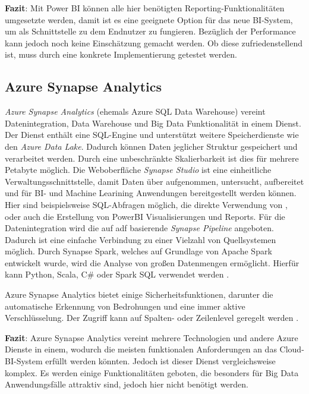 \textbf{Fazit}: Mit Power BI können alle hier benötigten Reporting-Funktionalitäten umgesetzte werden, damit ist es eine geeignete Option für das neue BI-System, um als Schnittstelle zu dem Endnutzer zu fungieren. Bezüglich der Performance kann jedoch noch keine Einschätzung gemacht werden. Ob diese zufriedenstellend ist, muss durch eine konkrete Implementierung getestet werden.


\subsection{Azure Synapse Analytics} \label{sec:grundlagen:azure_dienste:synapseAnalytics}
\textit{Azure Synapse Analytics} (ehemals Azure SQL Data Warehouse) vereint Datenintegration, Data Warehouse und Big Data Funktionalität in einem Dienst. Der Dienst enthält eine SQL-Engine und unterstützt weitere Speicherdienste wie den \textit{Azure Data Lake}. Dadurch können Daten jeglicher Struktur gespeichert und verarbeitet werden. Durch eine unbeschränkte Skalierbarkeit ist dies für mehrere Petabyte möglich. Die Weboberfläche \textit{Synapse Studio} ist eine einheitliche Verwaltungsschnittstelle, damit Daten über aufgenommen, untersucht, aufbereitet und für BI- und Machine Learining Anwendungen bereitgestellt werden können. Hier sind beispielsweise SQL-Abfragen möglich, die direkte Verwendung von , oder auch die Erstellung von PowerBI Visualisierungen und Reports. Für die Datenintegration wird die auf \ac{adf} basierende \textit{Synapse Pipeline} angeboten. Dadurch ist eine einfache Verbindung zu einer Vielzahl von Quellsystemen möglich. Durch Synapse Spark, welches auf Grundlage von Apache Spark entwickelt wurde, wird die Analyse von großen Datenmengen ermöglicht. Hierfür kann Python, Scala, C\# oder Spark SQL verwendet werden \cite{shiyal_beginning_2021}. 

Azure Synapse Analytics bietet einige Sicherheitsfunktionen, darunter die automatische Erkennung von Bedrohungen und eine immer aktive Verschlüsselung. Der Zugriff kann auf Spalten- oder Zeilenlevel geregelt werden \cite{shiyal_beginning_2021}.

\textbf{Fazit}: Azure Synapse Analytics vereint mehrere Technologien und andere Azure Dienste in einem, wodurch die meisten funktionalen Anforderungen an das Cloud-BI-System erfüllt werden könnten. Jedoch ist dieser Dienst vergleichsweise komplex. Es werden einige Funktionalitäten geboten, die besonders für Big Data Anwendungsfälle attraktiv sind, jedoch hier nicht benötigt werden.


